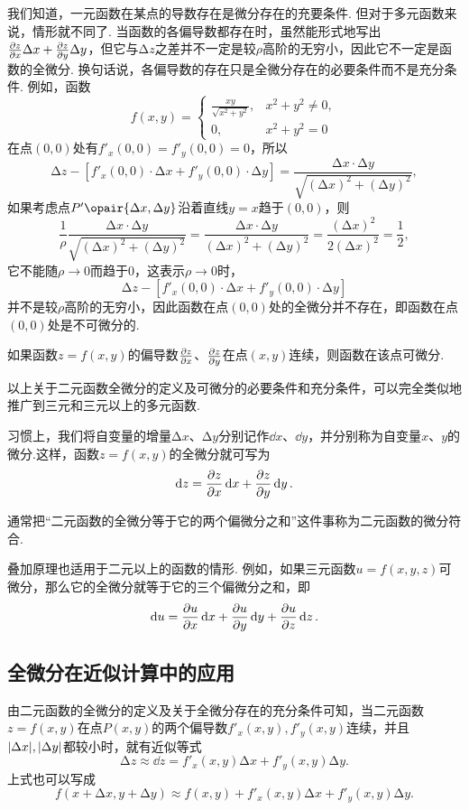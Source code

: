 我们知道，一元函数在某点的导数存在是微分存在的充要条件.
但对于多元函数来说，情形就不同了.
当函数的各偏导数都存在时，虽然能形式地写出\(\pdv{z}{x} \Delta x + \pdv{z}{y} \Delta y\)，但它与\(\increment z\)之差并不一定是较\(\rho\)高阶的无穷小，因此它不一定是函数的全微分.
换句话说，各偏导数的存在只是全微分存在的必要条件而不是充分条件.
例如，函数\[
f(x,y) = \left\{ \begin{array}{cl}
\frac{xy}{\sqrt{x^2+y^2}}, & x^2+y^2 \neq 0, \\
0, & x^2+y^2 = 0
\end{array} \right.
\]在点\((0,0)\)处有\(f'_x(0,0) = f'_y(0,0) = 0\)，所以\[
\increment z - [f'_x(0,0) \cdot \increment x + f'_y(0,0) \cdot \increment y]
= \frac{\increment x \cdot \increment y}{\sqrt{(\increment x)^2+(\increment y)^2}},
\]如果考虑点\(P'\opair{\increment x,\increment y}\)沿着直线\(y=x\)趋于\((0,0)\)，则\[
\frac{1}{\rho} \frac{\increment x \cdot \increment y}{\sqrt{(\increment x)^2+(\increment y)^2}}
= \frac{\increment x \cdot \increment y}{(\increment x)^2+(\increment y)^2}
= \frac{(\increment x)^2}{2(\increment x)^2}
= \frac{1}{2},
\]它不能随\(\rho\to0\)而趋于\(0\)，这表示\(\rho\to0\)时，\[
\increment z - [f'_x(0,0) \cdot \increment x + f'_y(0,0) \cdot \increment y]
\]并不是较\(\rho\)高阶的无穷小，因此函数在点\((0,0)\)处的全微分并不存在，即函数在点\((0,0)\)处是不可微分的.

\begin{theorem}[充分条件]\label{theorem:多元函数微分法.二元函数可微的充分条件}
如果函数\(z=f(x,y)\)的偏导数\(\pdv{z}{x}\)、\(\pdv{z}{y}\)在点\((x,y)\)连续，则函数在该点可微分.
\end{theorem}

以上关于二元函数全微分的定义及可微分的必要条件和充分条件，可以完全类似地推广到三元和三元以上的多元函数.

习惯上，我们将自变量的增量\(\increment x\)、\(\increment y\)分别记作\(\dd{x}\)、\(\dd{y}\)，并分别称为自变量\(x\)、\(y\)的微分.这样，函数\(z=f(x,y)\)的全微分就可写为\[
\dd{z}=\pdv{z}{x}\dd{x}+\pdv{z}{y}\dd{y}.
\]

通常把“二元函数的全微分等于它的两个偏微分之和”这件事称为二元函数的微分符合.

叠加原理也适用于二元以上的函数的情形.
例如，如果三元函数\(u = f(x,y,z)\)可微分，那么它的全微分就等于它的三个偏微分之和，即\[
\dd{u} = \pdv{u}{x} \dd{x} + \pdv{u}{y} \dd{y} + \pdv{u}{z} \dd{z}.
\]

\subsection{全微分在近似计算中的应用}
由二元函数的全微分的定义及关于全微分存在的充分条件可知，当二元函数\(z = f(x,y)\)在点\(P(x,y)\)的两个偏导数\(f'_x(x,y),f'_y(x,y)\)连续，并且\(\abs{\Delta x},\abs{\Delta y}\)都较小时，就有近似等式\[
\increment z \approx \dd{z} = f'_x(x,y) \increment x + f'_y(x,y) \increment y.
\]上式也可以写成\[
f(x+\increment x,y+\increment y) \approx f(x,y) + f'_x(x,y) \increment x + f'_y(x,y) \increment y.
\]

